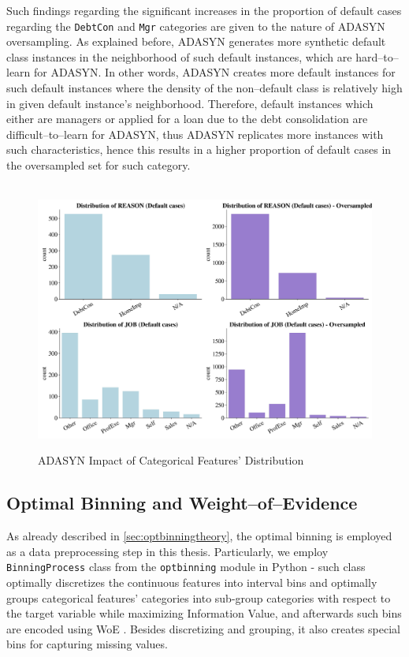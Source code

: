 Such findings regarding the significant increases in the proportion of default cases regarding the \texttt{DebtCon} and \texttt{Mgr} categories are given to the nature of ADASYN oversampling.
As explained before, ADASYN generates more synthetic default class instances in the neighborhood of such default instances, which are hard--to--learn for ADASYN.
In other words, ADASYN creates more default instances for such default instances where the density of the non--default class is relatively high in given default instance's neighborhood.
Therefore, default instances which either are managers or applied for a loan due to the debt consolidation are difficult--to--learn for ADASYN, thus ADASYN replicates more instances with such characteristics, hence this results in a higher proportion of default cases in the oversampled set for such category.


\begin{figure}[H]
    \centering
    \caption{ADASYN Impact of Categorical Features' Distribution}\vspace{0.5em}
    \label{fig:adasynimpact}\
    \includegraphics[width=140mm]{Figures/Categorical_Features_Distribution_OS_Default.jpg}
    \centering{\begin{source}Author's results in Python\end{source}}\vspace{-1em}
\end{figure}



\newpage
\subsection{Optimal Binning and Weight--of--Evidence}
\label{subsec:prep-optbinning}
As already described in \autoref{sec:optbinningtheory}, the optimal binning is employed as a data preprocessing step in this thesis.
Particularly, we employ \lstinline{BinningProcess} class from the \lstinline{optbinning} module in Python - such class optimally discretizes the continuous features into interval bins and optimally groups categorical features' categories into sub-group categories with respect to the target variable while maximizing Information Value, and afterwards such bins are encoded using WoE \citep{navas2020optimal}. Besides discretizing and grouping, it also creates special bins for capturing missing values.


